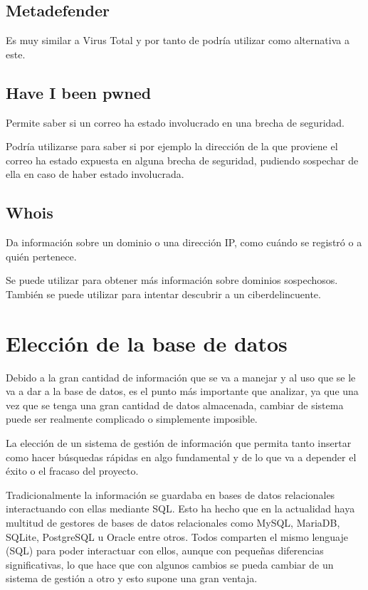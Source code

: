 \subsection{Metadefender}
Es muy similar a Virus Total y por tanto de podría utilizar como alternativa a este. 

\subsection{Have I been pwned}
Permite saber si un correo ha estado involucrado en una brecha de seguridad. 

Podría utilizarse para saber si por ejemplo la dirección de la que proviene el correo ha estado expuesta en alguna brecha de seguridad, pudiendo sospechar de ella en caso de haber estado involucrada. 

\subsection{Whois}
Da información sobre un dominio o una dirección IP, como cuándo se registró o a quién pertenece.

Se puede utilizar para obtener más información sobre dominios sospechosos. También se puede utilizar para intentar descubrir a un ciberdelincuente. 

\section{Elección de la base de datos}
Debido a la gran cantidad de información que se va a manejar y al uso que se le va a dar a la base de datos, es el punto más importante que analizar, ya que una vez que se tenga una gran cantidad de datos almacenada, cambiar de sistema puede ser realmente complicado o simplemente imposible. 

La elección de un sistema de gestión de información que permita tanto insertar como hacer búsquedas rápidas en algo fundamental y de lo que va a depender el éxito o el fracaso del proyecto.

Tradicionalmente la información se guardaba en bases de datos relacionales interactuando con ellas mediante SQL. Esto ha hecho que en la actualidad haya multitud de gestores de bases de datos relacionales como MySQL\cite{MySQL}, MariaDB\cite{MariaDB}, SQLite\cite{SQLite}, PostgreSQL\cite{PostgreSQL} u Oracle\cite{Oracle} entre otros. Todos comparten el mismo lenguaje (SQL) para poder interactuar con ellos, aunque con pequeñas diferencias significativas, lo que hace que con algunos cambios se pueda cambiar de un sistema de gestión a otro y esto supone una gran ventaja.


